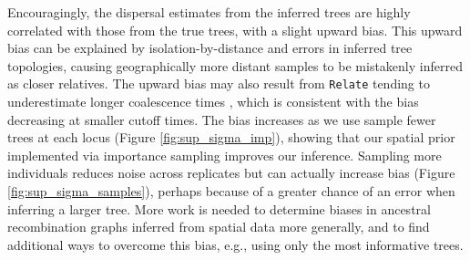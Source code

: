 \documentclass[12pt]{article}
\begin{document}
Encouragingly, the dispersal estimates from the inferred trees are highly correlated with those from the true trees, with a slight upward bias. This upward bias can be explained by isolation-by-distance and errors in inferred tree topologies, causing geographically more distant samples to be mistakenly inferred as closer relatives. The upward bias may also result from \texttt{Relate} tending to underestimate longer coalescence times \citep{brandt2022evaluation}, which is consistent with the bias decreasing at smaller cutoff times. The bias increases as we use sample fewer trees at each locus (Figure \ref{fig:sup_sigma_imp}), showing that our spatial prior implemented via importance sampling improves our inference. Sampling more individuals reduces noise across replicates but can actually increase bias (Figure \ref{fig:sup_sigma_samples}), perhaps because of a greater chance of an error when inferring a larger tree. More work is needed to determine biases in ancestral recombination graphs inferred from spatial data more generally, and to find additional ways to overcome this bias, e.g., using only the most informative trees.

\end{document}

